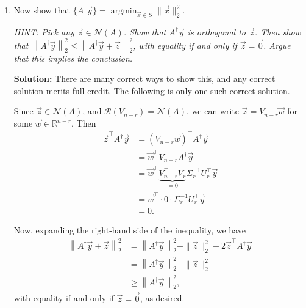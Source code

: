 \documentclass[10pt]{article}
\theoremstyle{definition}
\theoremstyle{plain}
\newcommand{\RR}{\mathbb{R}}
\newcommand{\NN}{\mathcal{N}}
\newcommand{\Range}{\mathcal{R}}
\DeclareMathOperator{\argmin}{argmin}
\begin{document}
\begin{enumerate}[label=(\alph*), start=3]
Now, since $A^\dagger \vec{y} \in S$, we know that $\vec{z} = A^\dagger \vec{y} - \vec{x} \in \NN(A)$ for any $\vec{x} \in S$. Thus, this $\vec{x}$ can be written as $A^\dagger \vec{y} - \vec{z}$ for some $\vec{z} \in \NN(A)$, and $\vec{z} \in \NN(A)$ if and only if $-\vec{z} \in \NN(A)$. Thus, any $\vec{x} \in S$ can be written as $\vec{x} = A^\dagger \vec{y} + \vec{z}$ for some $\vec{z} \in \NN(A)$, so $S \subseteq \{A^\dagger \vec{y} + \vec{z} \mid \vec{z} \in \NN(A)\}$.

To show the other direction, i.e., $S \supseteq \{A^\dagger \vec{y} + \vec{z} \mid \vec{z} \in \NN(A)\}$, note that for any $\vec{z} \in \NN(A)$ we can show that
\begin{align}
A^\top A(A^\dagger \vec{y} + \vec{z}) &= A^\top A A^\dagger \vec{y} + A^\top A \vec{z} \\
&= A^\top \vec{y} + \vec{0} \\
&= A^\top \vec{y},
\end{align}
so that $A^\dagger \vec{y} + \vec{z} \in S$. Thus $S = \{A^\dagger \vec{y} + \vec{z} \mid \vec{z} \in \NN(A)\}$ as desired.

\item Now show that $\{A^\dagger \vec{y}\} = \argmin_{\vec{x} \in S} \|\vec{x}\|_2^2$.

\textit{HINT: Pick any $\vec{z} \in \NN(A)$. Show that $A^\dagger \vec{y}$ is orthogonal to $\vec{z}$. Then show that $\left\|A^\dagger \vec{y}\right\|_2^2 \le \left\|A^\dagger \vec{y} + \vec{z}\right\|_2^2$, with equality if and only if $\vec{z} = \vec{0}$. Argue that this implies the conclusion.}

\textbf{Solution:} There are many correct ways to show this, and any correct solution merits full credit. The following is only one such correct solution.

Since $\vec{z} \in \NN(A)$, and $\Range(V_{n-r}) = \NN(A)$, we can write $\vec{z} = V_{n-r} \vec{w}$ for some $\vec{w} \in \RR^{n-r}$. Then
\begin{align}
\vec{z}^\top A^\dagger \vec{y} &= (V_{n-r} \vec{w})^\top A^\dagger \vec{y} \\
&= \vec{w}^\top V_{n-r}^\top A^\dagger \vec{y} \\
&= \vec{w}^\top \underbrace{V_{n-r}^\top V_r}_{=0} \Sigma_r^{-1} U_r^\top \vec{y} \\
&= \vec{w}^\top \cdot 0 \cdot \Sigma_r^{-1} U_r^\top \vec{y} \\
&= 0.
\end{align}

Now, expanding the right-hand side of the inequality, we have
\begin{align}
\left\|A^\dagger \vec{y} + \vec{z}\right\|_2^2 &= \left\|A^\dagger \vec{y}\right\|_2^2 + \|\vec{z}\|_2^2 + 2\vec{z}^\top A^\dagger \vec{y} \\
&= \left\|A^\dagger \vec{y}\right\|_2^2 + \|\vec{z}\|_2^2 \\
&\ge \left\|A^\dagger \vec{y}\right\|_2^2,
\end{align}
with equality if and only if $\vec{z} = \vec{0}$, as desired.
\end{enumerate}
\end{document}
